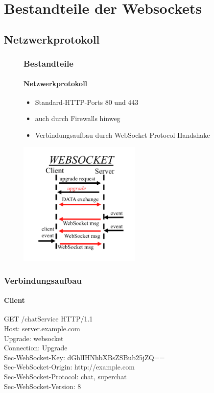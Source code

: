 \documentclass{beamer}
\begin{document}
\section{Bestandteile der Websockets}

\subsection{Netzwerkprotokoll}
\begin{frame}
\begin{figure}[htbp]
\frametitle{Bestandteile}
\framesubtitle{Netzwerkprotokoll}
\begin{minipage}[t]{5cm}
\vspace{0pt}
\begin{itemize}
\item Standard-HTTP-Ports 80 und 443
\item auch durch Firewalls hinweg
\item Verbindungsaufbau durch WebSocket Protocol Handshake
\end{itemize}
\end{minipage}
\hfill
\begin{minipage}[t]{5cm}
\vspace{0pt}
\includegraphics[width=6cm]{WebSocket.png}
\end{minipage}
\end{figure}
\end{frame}

\begin{frame}
\frametitle{Verbindungsaufbau}
\framesubtitle{Client}
GET /chatService HTTP/1.1\\
Host: server.example.com\\
Upgrade: websocket\\
Connection: Upgrade\\
Sec-WebSocket-Key: dGhlIHNhbXBsZSBub25jZQ==\\
Sec-WebSocket-Origin: http://example.com\\
Sec-WebSocket-Protocol: chat, superchat\\
Sec-WebSocket-Version: 8 \\
\end{frame}
\end{document}
